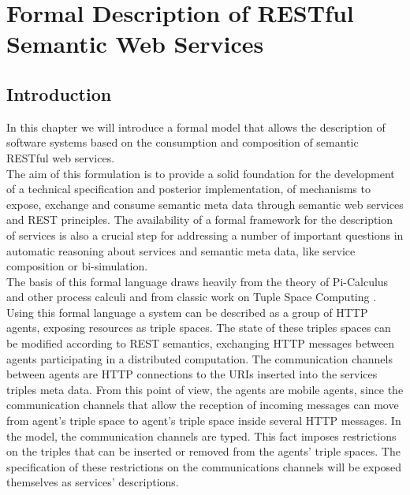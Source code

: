 \chapter{Formal Description of RESTful Semantic Web Services  \label{capituloFD}}

\section{Introduction}
In this chapter we will introduce a formal model that allows the description of software systems based on the consumption
and composition of semantic RESTful web services.\\

The aim of this formulation is to provide a solid foundation for the development of a technical specification and
posterior implementation, of mechanisms to expose, exchange and consume semantic meta data through semantic web services
and REST principles. The availability of a formal framework for the description of services is also a crucial step for
addressing a number of important questions in automatic reasoning about services and semantic meta data, like
service composition or bi-simulation.\\

The basis of this formal language draws heavily from the theory of
Pi-Calculus \cite{Milner99communicating} and other process calculi and from classic work on Tuple Space Computing
\cite{Gelernter85generativecommunication}.\\

Using this formal language a system can be described as a group of HTTP agents, exposing resources as
triple spaces. The state of these triples spaces can be modified according to REST semantics, exchanging HTTP messages between agents
participating in a distributed computation. The communication channels between agents are HTTP connections to the URIs
inserted into the services triples meta data. From this point of view, the agents are mobile agents, since the
communication channels that allow the reception of incoming messages can move from agent's triple space to agent's
triple space inside several HTTP messages. In the model, the communication channels are typed. This fact imposes
restrictions on the triples that can be inserted or removed from the agents' triple spaces. The specification of these
restrictions on the communications channels will be exposed themselves as services' descriptions.

